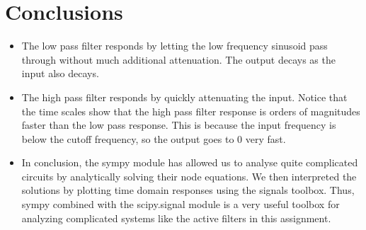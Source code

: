\documentclass[11pt]{article}
\providecommand{\tightlist}{%
      \setlength{\itemsep}{0pt}\setlength{\parskip}{0pt}}
\begin{document}
	
		
    \section{Conclusions}\label{conclusions}

\begin{itemize}
\tightlist
\item
  The low pass filter responds by letting the low frequency sinusoid
  pass through without much additional attenuation. The output decays as
  the input also decays.
\item
  The high pass filter responds by quickly attenuating the input. Notice
  that the time scales show that the high pass filter response is orders
  of magnitudes faster than the low pass response. This is because the
  input frequency is below the cutoff frequency, so the output goes to
  \(0\) very fast.
\item
  In conclusion, the sympy module has allowed us to analyse quite
  complicated circuits by analytically solving their node equations. We
  then interpreted the solutions by plotting time domain responses using
  the signals toolbox. Thus, sympy combined with the scipy.signal module
  is a very useful toolbox for analyzing complicated systems like the
  active filters in this assignment.
\end{itemize}

	


    
    
    
    
\end{document}
